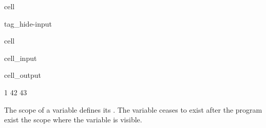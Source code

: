 \documentclass[a4paper,10pt,english]{jupyterBook}
\begin{document}
\begin{sphinxuseclass}{cell}
\begin{sphinxuseclass}{tag_hide-input}
\end{sphinxuseclass}
\end{sphinxuseclass}
\begin{sphinxuseclass}{cell}\begin{sphinxVerbatimInput}

\begin{sphinxuseclass}{cell_input}
\begin{sphinxVerbatim}[commandchars=\\\{\}]
\end{sphinxVerbatim}

\end{sphinxuseclass}\end{sphinxVerbatimInput}
\begin{sphinxVerbatimOutput}

\begin{sphinxuseclass}{cell_output}
\begin{sphinxVerbatim}[commandchars=\\\{\}]
1
42
43
\end{sphinxVerbatim}

\end{sphinxuseclass}\end{sphinxVerbatimOutput}

\end{sphinxuseclass}
\sphinxAtStartPar
The scope of a variable defines its . The variable ceases to exist after the program exist the scope where the variable is visible.
\end{document}
